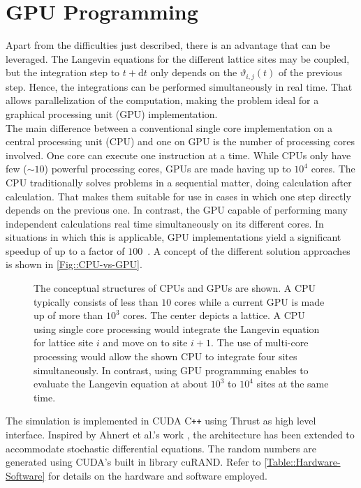 	\section{GPU Programming}
	Apart from the difficulties just described, there is an advantage that can be leveraged. The Langevin equations for the different lattice sites may be coupled, but the integration step to $t + \text{d}t$ only depends on the $\vartheta_{i, j}(t)$ of the previous step. Hence, the integrations can be performed simultaneously in real time. That allows parallelization of the computation, making the problem ideal for a graphical processing unit (GPU) implementation. \\
	
	The main difference between a conventional single core implementation on a central processing unit (CPU) and one on GPU is the number of processing cores involved. One core can execute one  instruction at a time. While CPUs only have few ($\sim 10$) powerful processing cores, GPUs are made having up to $10^4$ cores. The CPU traditionally solves problems in a sequential matter, doing calculation after calculation. That makes them suitable for use in cases in which one step directly depends on the previous one. In contrast, the GPU capable of performing many independent calculations real time simultaneously on its different cores. In situations in which this is applicable, GPU implementations yield a significant speedup of up to a factor of $100$~\cite{che2008performance}. A concept of the different solution approaches is shown in \autoref{Fig::CPU-vs-GPU}.\\
	\begin{figure}
		\centering
		
		\caption{The conceptual structures of CPUs and GPUs are shown. A CPU typically consists of less than $10$ cores while a current GPU is made up of more than $10^3$ cores. The center depicts a lattice. A CPU using single core processing would integrate the Langevin equation for lattice site $i$ and move on to site $i+1$. The use of multi-core processing would allow the shown CPU to integrate four sites simultaneously. In contrast, using GPU programming enables to evaluate the Langevin equation at about $10^3$ to $10^4$ sites at the same time.}
		\label{Fig::CPU-vs-GPU}
	\end{figure}
	
	The simulation is implemented in CUDA C\texttt{++} \cite{cuda} using Thrust \cite{thrust} as high level interface. Inspired by Ahnert et al.'s work \cite{ahnert2014solving}, the architecture has been extended to accommodate stochastic differential equations. The random numbers are generated using CUDA's built in library cuRAND. Refer to \autoref{Table::Hardware-Software} for details on the hardware and software employed.
	
